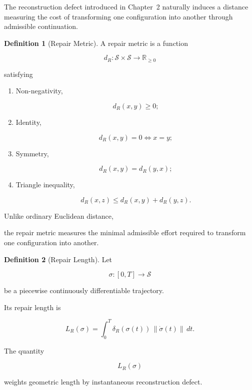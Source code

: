 \documentclass[11pt]{book}
\numberwithin{equation}{chapter}
\theoremstyle{definition}
\newtheorem{definition}{Definition}[chapter]
\theoremstyle{plain}
\begin{document}
The reconstruction defect introduced in Chapter~2 naturally induces a
distance measuring the cost of transforming one configuration into
another through admissible continuation.

\begin{definition}[Repair Metric]

A repair metric is a function

\[
d_R:
\mathcal S\times\mathcal S
\rightarrow
\mathbb R_{\ge0}
\]

satisfying

\begin{enumerate}

\item
Non-negativity,

\[
d_R(x,y)\ge0;
\]

\item
Identity,

\[
d_R(x,y)=0
\iff
x=y;
\]

\item
Symmetry,

\[
d_R(x,y)=d_R(y,x);
\]

\item
Triangle inequality,

\[
d_R(x,z)
\le
d_R(x,y)+d_R(y,z).
\]

\end{enumerate}

\end{definition}

Unlike ordinary Euclidean distance,

the repair metric measures the minimal admissible effort required to
transform one configuration into another.

\begin{definition}[Repair Length]

Let

\[
\sigma:
[0,T]
\rightarrow
\mathcal S
\]

be a piecewise continuously differentiable trajectory.

Its repair length is

\[
L_R(\sigma)
=
\int_0^T
\delta_R(\sigma(t))
\,
\|\dot\sigma(t)\|
\,dt.
\]

\end{definition}

The quantity

\[
L_R(\sigma)
\]

weights geometric length by instantaneous reconstruction defect.
\end{document}
